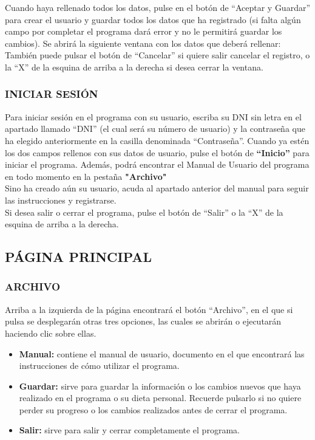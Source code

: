 Cuando haya rellenado todos los datos, pulse en el botón de “Aceptar y Guardar” para crear el usuario y guardar todos los datos que ha registrado (si falta algún campo por completar el programa dará error y no le permitirá guardar los cambios).
Se abrirá la siguiente ventana con los datos que deberá rellenar:
También puede pulsar el botón de “Cancelar” si quiere salir cancelar el registro, o la “X” de la esquina de arriba a la derecha si desea cerrar la ventana.
\subsubsection{INICIAR SESIÓN}
Para iniciar sesión en el programa con su usuario, escriba su DNI sin letra en el apartado llamado “DNI” (el cual será su número de usuario) y la contraseña que ha elegido anteriormente en la casilla denominada “Contraseña”. Cuando ya estén los dos campos rellenos con sus datos de usuario, pulse el botón de \textbf{“Inicio”} para iniciar el programa. Además, podrá encontrar el Manual de Usuario del programa en todo momento en la pestaña \textbf{"Archivo"}\\
Sino ha creado aún su usuario, acuda al apartado anterior del manual para seguir las instrucciones y registrarse.\\
Si desea salir o cerrar el programa, pulse el botón de “Salir” o la “X” de la esquina de arriba a la derecha.
\subsection{PÁGINA PRINCIPAL}
\subsubsection{ARCHIVO}
Arriba a la izquierda de la página encontrará el botón “Archivo”, en el que si pulsa se desplegarán otras tres opciones, las cuales se abrirán o ejecutarán haciendo clic sobre ellas.
\begin{itemize}
\item	\textbf{Manual:} contiene el manual de usuario, documento en el que encontrará las instrucciones de cómo utilizar el programa.
\item	\textbf{Guardar:} sirve para guardar la información o los cambios nuevos que haya realizado en el programa o su dieta personal. Recuerde pulsarlo si no quiere perder su progreso o los cambios realizados antes de cerrar el programa.
\item	\textbf{Salir:} sirve para salir y cerrar completamente el programa.
\end{itemize}
